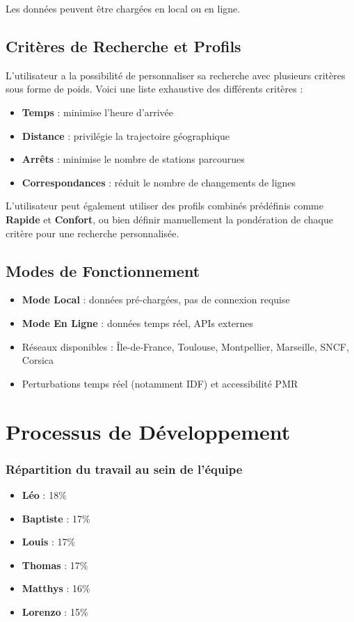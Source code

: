 \documentclass[12pt,a4paper]{article}
\begin{document}
Les données peuvent être chargées en local ou en ligne.

\subsection{Critères de Recherche et Profils}

L'utilisateur a la possibilité de personnaliser sa recherche avec plusieurs critères sous forme de poids. Voici une liste exhaustive des différents critères :
\begin{itemize}
    \item \textbf{Temps} : minimise l'heure d'arrivée
    \item \textbf{Distance} : privilégie la trajectoire géographique
    \item \textbf{Arrêts} : minimise le nombre de stations parcourues
    \item \textbf{Correspondances} : réduit le nombre de changements de lignes
\end{itemize}

L'utilisateur peut également utiliser des profils combinés prédéfinis comme \textbf{Rapide} et \textbf{Confort}, ou bien définir manuellement la pondération de chaque critère pour une recherche personnalisée.

\subsection{Modes de Fonctionnement}

\begin{itemize}
    \item \textbf{Mode Local} : données pré-chargées, pas de connexion requise
    \item \textbf{Mode En Ligne} : données temps réel, APIs externes
    \item Réseaux disponibles : Île-de-France, Toulouse, Montpellier, Marseille, SNCF, Corsica
    \item Perturbations temps réel (notamment IDF) et accessibilité PMR
\end{itemize}

\section{Processus de Développement}

\subsubsection*{Répartition du travail au sein de l'équipe}
\begin{itemize}
    \item \textbf{Léo} : 18\%
    \item \textbf{Baptiste} : 17\%
    \item \textbf{Louis} : 17\%
    \item \textbf{Thomas} : 17\%
    \item \textbf{Matthys} : 16\%
    \item \textbf{Lorenzo} : 15\%
\end{itemize}
\end{document}
